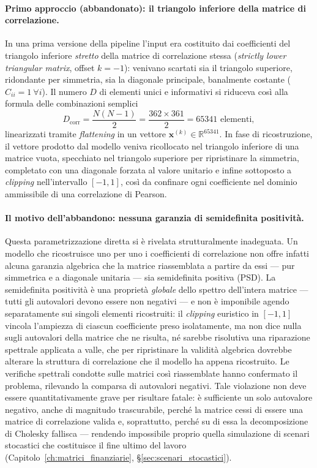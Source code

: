 \paragraph{Primo approccio (abbandonato): il triangolo inferiore della matrice di correlazione.} In una prima versione della pipeline l'input era costituito dai coefficienti del triangolo inferiore \emph{stretto} della matrice di correlazione stessa (\emph{strictly lower triangular matrix}, offset $k=-1$): venivano scartati sia il triangolo superiore, ridondante per simmetria, sia la diagonale principale, banalmente costante ($C_{ii}=1\ \forall i$). Il numero $D$ di elementi unici e informativi si riduceva così alla formula delle combinazioni semplici
\begin{equation}
D_{\text{corr}} = \frac{N(N - 1)}{2} = \frac{362 \times 361}{2} = 65341 \text{ elementi},
\end{equation}
linearizzati tramite \emph{flattening} in un vettore $\mathbf{x}^{(k)} \in \mathbb{R}^{65341}$. In fase di ricostruzione, il vettore prodotto dal modello veniva ricollocato nel triangolo inferiore di una matrice vuota, specchiato nel triangolo superiore per ripristinare la simmetria, completato con una diagonale forzata al valore unitario e infine sottoposto a \emph{clipping} nell'intervallo $[-1,1]$, così da confinare ogni coefficiente nel dominio ammissibile di una correlazione di Pearson.

\paragraph{Il motivo dell'abbandono: nessuna garanzia di semidefinita positività.} Questa parametrizzazione diretta si è rivelata strutturalmente inadeguata. Un modello che ricostruisce uno per uno i coefficienti di correlazione non offre infatti alcuna garanzia algebrica che la matrice riassemblata a partire da essi --- pur simmetrica e a diagonale unitaria --- sia semidefinita positiva (PSD). La semidefinita positività è una proprietà \emph{globale} dello spettro dell'intera matrice --- tutti gli autovalori devono essere non negativi --- e non è imponibile agendo separatamente sui singoli elementi ricostruiti: il \emph{clipping} euristico in $[-1,1]$ vincola l'ampiezza di ciascun coefficiente preso isolatamente, ma non dice nulla sugli autovalori della matrice che ne risulta, né sarebbe risolutiva una riparazione spettrale applicata a valle, che per ripristinare la validità algebrica dovrebbe alterare la struttura di correlazione che il modello ha appena ricostruito. Le verifiche spettrali condotte sulle matrici così riassemblate hanno confermato il problema, rilevando la comparsa di autovalori negativi. Tale violazione non deve essere quantitativamente grave per risultare fatale: è sufficiente un solo autovalore negativo, anche di magnitudo trascurabile, perché la matrice cessi di essere una matrice di correlazione valida e, soprattutto, perché su di essa la decomposizione di Cholesky fallisca --- rendendo impossibile proprio quella simulazione di scenari stocastici che costituisce il fine ultimo del lavoro (Capitolo~\ref{ch:matrici_finanziarie}, \S\ref{sec:scenari_stocastici}).

